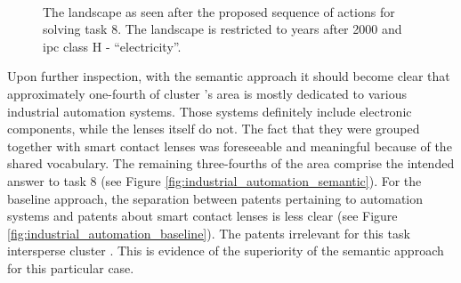\begin{figure}[!]
    \centering
    \\
    \caption{The landscape as seen after the proposed sequence of actions for solving task 8. The landscape is restricted to years after 2000 and \gls{ipc} class H - ``electricity''.}
    \label{fig:electronic_components}
\end{figure}

Upon further inspection, with the semantic approach it should become clear that approximately one-fourth of cluster 's area is mostly dedicated to various industrial automation systems.
Those systems definitely include electronic components, while the lenses itself do not.
The fact that they were grouped together with smart contact lenses was foreseeable and meaningful because of the shared vocabulary.
The remaining three-fourths of the area comprise the intended answer to task 8 (see Figure \autoref{fig:industrial_automation_semantic}).
For the baseline approach, the separation between patents pertaining to automation systems and patents about smart contact lenses is less clear (see Figure \autoref{fig:industrial_automation_baseline}).
The patents irrelevant for this task intersperse cluster .
This is evidence of the superiority of the semantic approach for this particular case.

